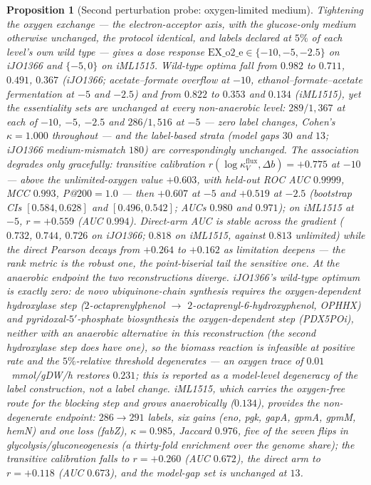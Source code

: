 \documentclass[11pt,a4paper]{article}
\theoremstyle{plain}
\newtheorem{proposition}[theorem]{Proposition}
\theoremstyle{definition}
\theoremstyle{remark}
\begin{document}
\begin{proposition}[Second perturbation probe: oxygen-limited medium]
\label{prop:keio-o2-limited}
Tightening the oxygen exchange --- the electron-acceptor axis, with
the glucose-only medium otherwise unchanged, the protocol identical,
and labels declared at $5\%$ of each level's own wild type --- gives
a dose response $\mathrm{EX\_o2\_e}\in\{-10,-5,-2.5\}$ on iJO1366
and $\{-5,0\}$ on iML1515. Wild-type optima fall from $0.982$ to
$0.711$, $0.491$, $0.367$ (iJO1366; acetate--formate overflow at
$-10$, ethanol--formate--acetate fermentation at $-5$ and $-2.5$)
and from $0.822$ to $0.353$ and $0.134$ (iML1515), yet the
essentiality sets are unchanged at every non-anaerobic level:
$289/1{,}367$ at each of $-10$, $-5$, $-2.5$ and $286/1{,}516$ at
$-5$ --- zero label changes, Cohen's $\kappa=1.000$ throughout ---
and the label-based strata (model gaps $30$ and $13$; iJO1366
medium-mismatch $180$) are correspondingly unchanged. The
association degrades only gracefully: transitive calibration
$r(\log\kappa^{\mathrm{flux}}_V,\Delta b)=+0.775$ at $-10$ ---
\emph{above} the unlimited-oxygen value $+0.603$, with held-out ROC
AUC $0.9999$, MCC $0.993$, P@$200=1.0$ --- then $+0.607$ at $-5$
and $+0.519$ at $-2.5$ (bootstrap CIs $[0.584,0.628]$ and
$[0.496,0.542]$; AUCs $0.980$ and $0.971$); on iML1515 at $-5$,
$r=+0.559$ (AUC $0.994$). Direct-arm AUC is stable across the
gradient ($0.732$, $0.744$, $0.726$ on iJO1366; $0.818$ on iML1515,
against $0.813$ unlimited) while the direct Pearson decays from
$+0.264$ to $+0.162$ as limitation deepens --- the rank metric is
the robust one, the point-biserial tail the sensitive one. At the
anaerobic endpoint the two reconstructions diverge. iJO1366's
wild-type optimum is exactly zero: de novo ubiquinone-chain
synthesis requires the oxygen-dependent hydroxylase step
($2$-octaprenylphenol $\to$ $2$-octaprenyl-6-hydroxyphenol, OPHHX)
and pyridoxal-$5'$-phosphate biosynthesis the oxygen-dependent step
(PDX5POi), neither with an anaerobic alternative in this
reconstruction (the second hydroxylase step does have one), so the
biomass reaction is infeasible at positive rate and the
$5\%$-relative threshold degenerates --- an oxygen trace of
$0.01$~mmol/gDW/h restores $0.231$; this is reported as a
model-level degeneracy of the label construction, not a label
change. iML1515, which carries the oxygen-free route for the
blocking step and grows anaerobically ($0.134$), provides the
non-degenerate endpoint: $286\to291$ labels, six gains
(\emph{eno}, \emph{pgk}, \emph{gapA}, \emph{gpmA}, \emph{gpmM},
\emph{hemN}) and one loss (\emph{fabZ}), $\kappa=0.985$, Jaccard
$0.976$, five of the seven flips in glycolysis/gluconeogenesis (a
thirty-fold enrichment over the genome share); the transitive
calibration falls to $r=+0.260$ (AUC $0.672$), the direct arm to
$r=+0.118$ (AUC $0.673$), and the model-gap set is unchanged at
$13$.
\end{proposition}
\end{document}
